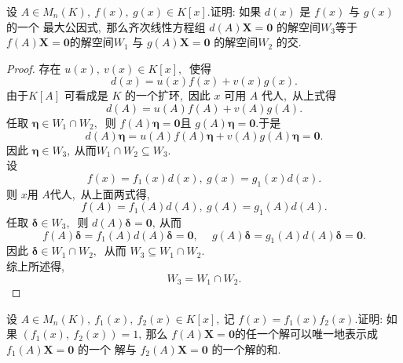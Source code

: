 \newpage
\begin{problem}
	设 $ A \in M_{n}(K),\  f(x),\  g(x) \in K[x]  .$证明: 如果 $ d(x)$  是 $ f(x)$  与 $ g(x) $ 的一个 最大公因式,\  那么齐次线性方程组 $ d(A) \boldsymbol{X}=\mathbf{0} $ 的解空间$  W_{3}  $等于 $ f(A) \boldsymbol{X}=\mathbf{0}  $的解空间$  W_{1} $ 与 $ g(A) \boldsymbol{X}=\mathbf{0} $ 的解空间$  W_{2} $ 的交.
\end{problem}
\begin{proof}
	存在  $u(x),\  v(x) \in K[x] ,\ $ 使得
	$$d(x)=u(x) f(x)+v(x) g(x) .$$
	由于$  K[A] $ 可看成是  $K$  的一个扩环,\  因此  $x$  可用 $ A $ 代人,\  从上式得
	$$d(A)=u(A) f(A)+v(A) g(A) .$$
	任取  $\boldsymbol{\eta} \in W_{1} \cap W_{2} ,\ $ 则  $f(A) \boldsymbol{\eta}=\mathbf{0}  $且 $ g(A) \boldsymbol{\eta}=\mathbf{0}  .$于是
	$$d(A) \boldsymbol{\eta}=u(A) f(A) \boldsymbol{\eta}+v(A) g(A) \boldsymbol{\eta}=\boldsymbol{0} .$$
	因此  $\boldsymbol{\eta} \in W_{3} ,\  从而  W_{1} \cap W_{2} \subseteq W_{3}  .$\\
	设 
	$$ f(x)=f_{1}(x) d(x),\  g(x)=g_{1}(x) d(x) .$$
	则 $ x  $用 $ A  $代人,\  从上面两式得,\ 
	$$f(A)=f_{1}(A) d(A),\  g(A)=g_{1}(A) d(A) .$$
	任取  $\boldsymbol{\delta} \in W_{3} ,\ $ 则  $d(A) \boldsymbol{\delta}=\mathbf{0} ,\  $从而
	$$f(A) \boldsymbol{\delta}=f_{1}(A) d(A) \boldsymbol{\delta}=\mathbf{0},\  \quad g(A) \boldsymbol{\delta}=g_{1}(A) d(A) \boldsymbol{\delta}=\mathbf{0} .$$
	因此  $\boldsymbol{\delta} \in W_{1} \cap W_{2} ,\ $ 从而  $W_{3} \subseteq W_{1} \cap W_{2}  .$\\
	综上所述得,\ 
	$$W_{3}=W_{1} \cap W_{2} .$$
\end{proof}
\newpage
\begin{problem}
	设 $ A \in M_{n}(K),\  f_{1}(x),\  f_{2}(x) \in K[x] ,\  $记 $ f(x)=f_{1}(x) f_{2}(x)  .$证明: 如果  $\left(f_{1}(x),\  f_{2}(x)\right)=1 ,\  $那么 $ f(A) \boldsymbol{X}=\mathbf{0}  $的任一个解可以唯一地表示成  $f_{1}(A) \boldsymbol{X}=\mathbf{0} $ 的一个 解与 $ f_{2}(A) \boldsymbol{X}=\mathbf{0} $ 的一个解的和.
\end{problem}
